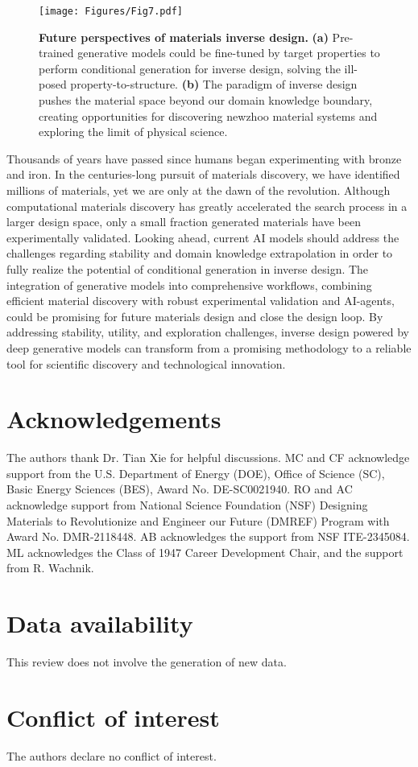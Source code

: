 \documentclass[fleqn,10pt]{wlscirep}
\begin{document}
\begin{figure}[!htbp]
    \centering
    \texttt{[image: Figures/Fig7.pdf]}
    \caption{\textbf{Future perspectives of materials inverse design.} \textbf{(a)} Pre-trained generative models could be fine-tuned by target properties to perform conditional generation for inverse design, solving the ill-posed property-to-structure. \textbf{(b)} The paradigm of inverse design pushes the material space beyond our domain knowledge boundary, creating opportunities for discovering newzhoo material systems and exploring the limit of physical science.}
    \label{fig7}
\end{figure}

Thousands of years have passed since humans began experimenting with bronze and iron. In the centuries-long pursuit of materials discovery, we have identified millions of materials, yet we are only at the dawn of the revolution.
Although computational materials discovery has greatly accelerated the search process in a larger design space, only a small fraction generated materials have been experimentally validated.
Looking ahead, current AI models should address the challenges regarding stability and domain knowledge extrapolation in order to fully realize the potential of conditional generation in inverse design. 
The integration of generative models into comprehensive workflows, combining efficient material discovery with robust experimental validation and AI-agents, could be promising for future materials design and close the design loop.   
By addressing stability, utility, and exploration challenges, inverse design powered by deep generative models can transform from a promising methodology to a reliable tool for scientific discovery and technological innovation.

\section*{Acknowledgements}
The authors thank Dr. Tian Xie for helpful discussions. MC and CF acknowledge support from the U.S. Department of Energy (DOE), Office of Science (SC), Basic Energy Sciences (BES), Award No. DE-SC0021940. RO and AC acknowledge support from National Science Foundation
(NSF) Designing Materials to Revolutionize and Engineer our Future (DMREF) Program with Award No. DMR-2118448. AB acknowledges the support from NSF ITE-2345084. ML acknowledges the Class of 1947 Career Development Chair, and the support from R. Wachnik.

\section*{Data availability}
This review does not involve the generation of new data.

\section*{Conflict of interest}
The authors declare no conflict of interest.

\end{document}
